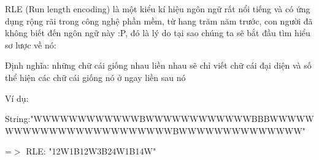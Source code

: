 RLE (Run length encoding) là một kiểu kí hiệu ngôn ngữ rất nổi tiếng và có ứng dụng rộng rãi trong công nghệ phần mềm, từ hang trăm năm trước, con người đã không biết đến ngôn ngữ này :P, đó là lý do tại sao chúng ta sẽ bắt đầu tìm hiểu sơ lược về nó:

Định nghĩa: những chữ cái giống nhau liền nhau sẽ chỉ viết chữ cái đại diện và số thể hiện các chữ cái giống nó ở ngay liền sau nó

Ví dụ:

String:"WWWWWWWWWWWWBWWWWWWWWWWWWBBBWWWWWWWWWWWWWWWWWWWWWWWWBWWWWWWWWWWWWWW" \textbf{}

=$>$ RLE: "12W1B12W3B24W1B14W"